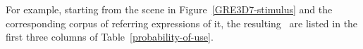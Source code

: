 
%
%
%
%
%
%
%
For example, starting from the scene in Figure~\ref{GRE3D7-stimulus} and the corresponding corpus of referring expressions of it, the resulting \puse\ are listed in the first three columns of Table~\ref{probability-of-use}. 

